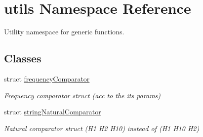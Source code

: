 \hypertarget{namespaceutils}{}\section{utils Namespace Reference}
\label{namespaceutils}


Utility namespace for generic functions.  


\subsection*{Classes}
\begin{DoxyCompactItemize}
\item 
struct \hyperlink{structutils_1_1frequency_comparator}{frequency\+Comparator}
\begin{DoxyCompactList}\small\item\em Frequency comparator struct (acc to the its params) \end{DoxyCompactList}\item 
struct \hyperlink{structutils_1_1string_natural_comparator}{string\+Natural\+Comparator}
\begin{DoxyCompactList}\small\item\em Natural comparator struct (H1 H2 H10) instead of (H1 H10 H2) \end{DoxyCompactList}\end{DoxyCompactItemize}
